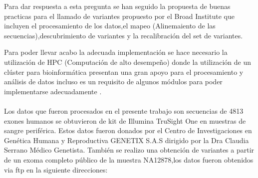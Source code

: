 Para dar respuesta a esta pregunta se han seguido la propuesta de buenas practicas para el llamado de variantes propuesto por el Broad Institute que incluyen el procesamiento de los datos,el mapeo (Alinemaiento de las secuencias),descubrimiento de variantes y la recalibración del set de variantes.

Para poder llevar acabo la adecuada implementación se hace necesario la utilización de HPC (Computación de alto desempeño) donde la utilización de un clúster para bioinformática presentan una gran apoyo para el procesamiento y análisis de datos incluso es un requisito de algunos módulos para poder implementarse adecuadamente \cite{Fisch2015}.\\
\\
Los datos que fueron procesados en el presente trabajo son secuencias de 4813 exones humanos se obtuvieron de kit de Illumina TruSight One en muestras de sangre periférica. Estos datos  fueron donados por el Centro de Investigaciones en Genética Humana y Reproductiva GENETIX S.A.S dirigido por la Dra Claudia Serrano Médico Genetista. También se realizo una obtención de variantes a partir de un exoma completo público de la muestra NA12878,los datos fueron obtenidos via ftp en la siguiente direcciones:\\
\\
